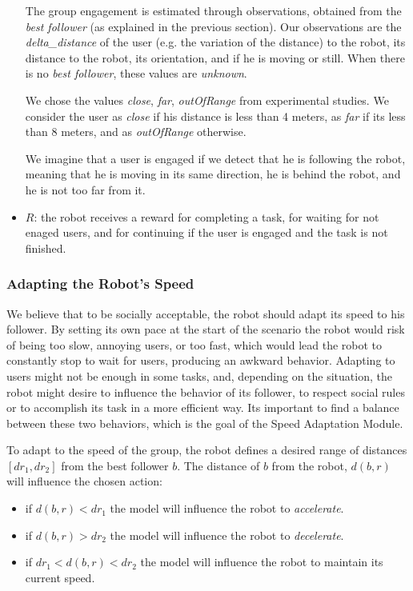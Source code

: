 \begin{itemize}
		The group engagement is estimated through observations, obtained from the \textit{best follower} (as explained in the previous section). Our observations are the \textit{delta\_distance} of the user (e.g. the variation of the distance) to the robot, its distance to the robot, its orientation, and if he is moving or still. When there is no \textit{best follower}, these values are \textit{unknown}.

		We chose the values \textit{close}, \textit{far}, \textit{outOfRange} from experimental studies. We consider the user as \textit{close} if his distance is less than 4 meters, as \textit{far} if its less than 8 meters, and as \textit{outOfRange} otherwise.

		We imagine that a user is engaged if we detect that he is following the robot, meaning that he is moving in its same direction, he is behind the robot, and he is not too far from it.

	\item  $R$: the robot receives a reward for completing a task, for waiting for not enaged users, and for continuing if the user is engaged and the task is not finished.
\end{itemize}


\subsubsection{Adapting the Robot's Speed}
We believe that to be socially acceptable, the robot should adapt its speed to his follower. By setting its own pace at the start of the scenario the robot  would risk of being too slow, annoying users, or too fast, which would lead the robot to constantly stop to wait for users, producing an awkward behavior. Adapting to users might not be enough in some tasks, and, depending on the situation, the robot might desire to influence the behavior of its follower, to respect social rules or to accomplish its task in a more efficient way. Its important to find a balance between these two behaviors, which is the goal of the Speed Adaptation Module. 

To adapt to the speed of the group, the robot defines a desired range of distances $[dr_1,dr_2]$ from the best follower $b$. The distance of $b$ from the robot, $d(b,r)$ will influence the chosen action:
\begin{itemize}
\item if $d(b,r)<dr_1$ the model will influence the robot to \textit{accelerate}.
\item if $d(b,r)>dr_2$  the model will influence the robot to \textit{decelerate}.
\item if $dr_1<d(b,r)<dr_2$ the model will influence the robot to maintain its current speed.
\end{itemize} 

